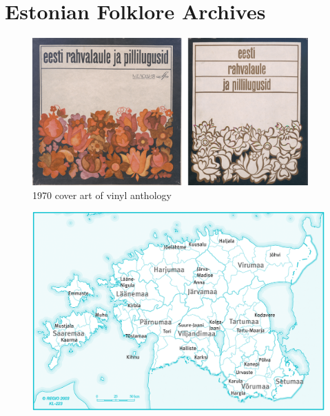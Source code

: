 \chapter{Estonian Folklore Archives}
\begin{figure}[htb]
\begin{center}
\includegraphics[width=300pt]{figures/vinyyl.png}
\caption{1970 cover art of vinyl anthology}
\label{vinyl1970}
\end{center}
\end{figure}

\begin{figure}[htp]
\centering
\includegraphics[width=0.9\linewidth]{figures/kihelkonnad}
\end{figure} 

